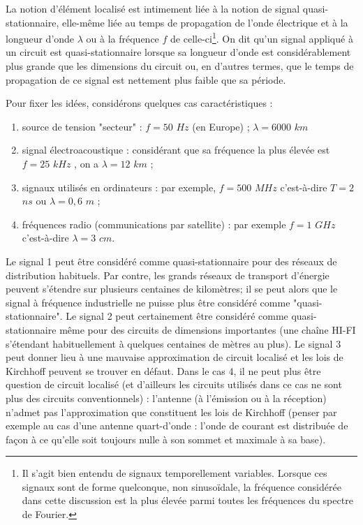 La notion d'élément localisé est intimement liée à la notion de signal quasi-stationnaire, elle-même liée au temps de propagation de l'onde électrique et à la longueur d'onde $\lambda$ ou à la fréquence $f$ de celle-ci\footnote{Il s'agit bien entendu de signaux temporellement variables. Lorsque ces signaux sont de forme quelconque, non sinusoïdale, la fréquence considérée dans cette discussion est la plus élevée parmi toutes les fréquences du spectre de Fourier. }. On dit qu'un signal appliqué à un circuit est quasi-stationnaire lorsque sa longueur d'onde est considérablement plus grande que les dimensions du circuit ou, en d'autres termes, que le temps de propagation de ce signal est nettement plus faible que sa période. 

Pour fixer les idées, considérons quelques cas caractéristiques :
\begin{enumerate}
	\item source de tension "secteur" : $f = 50$ $Hz$ (en Europe) ; $\lambda = 6000$ $km$
	\item signal électroacoustique : considérant que sa fréquence la plus élevée est $f = 25$ $kHz$ , on a $\lambda = 12$ $km$ ; 
	\item signaux utilisés en ordinateurs : par exemple, $f = 500$ $MHz$ c'est-à-dire $T = 2$ $ns$ ou $\lambda = 0,6$ $m$ ; 
	\item fréquences radio (communications par satellite) : par exemple $f = 1$ $GHz$ c'est-à-dire $\lambda = 3$ $cm$. 
\end{enumerate}
Le signal 1 peut être considéré comme quasi-stationnaire pour des réseaux de distribution habituels. Par contre, les grands réseaux de transport d'énergie peuvent s'étendre sur plusieurs centaines de kilomètres; il se peut alors que le signal à fréquence industrielle ne puisse plus être considéré comme "quasi-stationnaire". Le signal 2 peut certainement être considéré comme quasi-stationnaire même pour des circuits de dimensions importantes (une chaîne HI-FI s'étendant habituellement à quelques centaines de mètres au plus). Le signal 3 peut donner lieu à une mauvaise approximation de circuit localisé et les lois de Kirchhoff peuvent se trouver en défaut. Dans le cas 4, il ne peut plus être question de circuit localisé (et d'ailleurs les circuits utilisés dans ce cas ne sont plus des circuits conventionnels) : l'antenne (à l'émission ou à la réception) n'admet pas l'approximation que constituent les lois de Kirchhoff (penser par exemple au cas d'une antenne quart-d'onde : l'onde de courant est distribuée de façon à ce qu'elle soit toujours nulle à son sommet et maximale à sa base).

